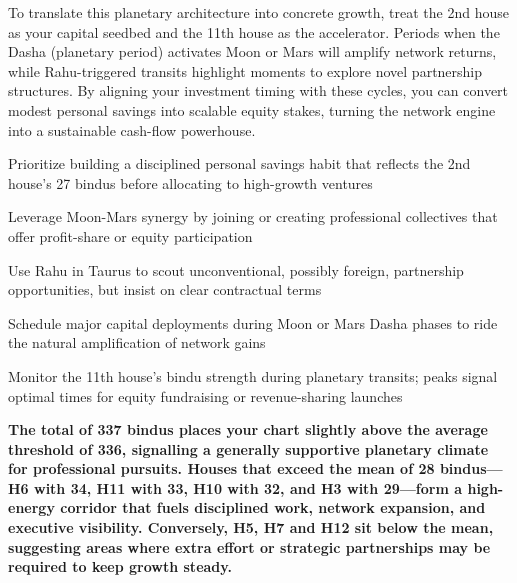 {\fontsize{9}{13}\selectfont To translate this planetary architecture into concrete growth, treat the 2nd house as your capital seedbed and the 11th house as the accelerator. Periods when the Dasha (planetary period) activates Moon or Mars will amplify network returns, while Rahu-triggered transits highlight moments to explore novel partnership structures. By aligning your investment timing with these cycles, you can convert modest personal savings into scalable equity stakes, turning the network engine into a sustainable cash-flow powerhouse.}\par\vspace{1.8mm}

\begin{diamondlist}
  \item {\fontsize{8.5}{12}\selectfont Prioritize building a disciplined personal savings habit that reflects the 2nd house's 27 bindus before allocating to high-growth ventures}
  \item {\fontsize{8.5}{12}\selectfont Leverage Moon-Mars synergy by joining or creating professional collectives that offer profit-share or equity participation}
  \item {\fontsize{8.5}{12}\selectfont Use Rahu in Taurus to scout unconventional, possibly foreign, partnership opportunities, but insist on clear contractual terms}
  \item {\fontsize{8.5}{12}\selectfont Schedule major capital deployments during Moon or Mars Dasha phases to ride the natural amplification of network gains}
  \item {\fontsize{8.5}{12}\selectfont Monitor the 11th house's bindu strength during planetary transits; peaks signal optimal times for equity fundraising or revenue-sharing launches}
\end{diamondlist}


\label{topic53}

{\fontsize{9.5}{13.8}\selectfont\bfseries\color{DeepSlate} The total of 337 bindus places your chart slightly above the average threshold of 336, signalling a generally supportive planetary climate for professional pursuits. Houses that exceed the mean of 28 bindus---H6 with 34, H11 with 33, H10 with 32, and H3 with 29---form a high-energy corridor that fuels disciplined work, network expansion, and executive visibility. Conversely, H5, H7 and H12 sit below the mean, suggesting areas where extra effort or strategic partnerships may be required to keep growth steady.}\par\vspace{2mm}


